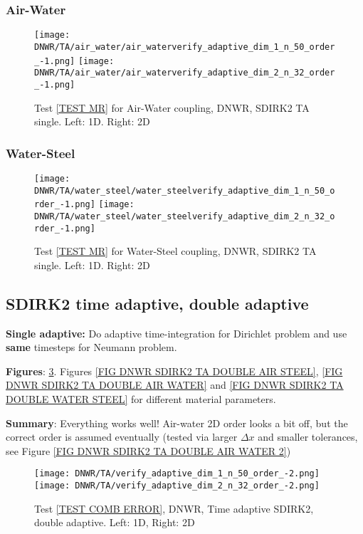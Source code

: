 \documentclass[a4paper,10pt]{article}
\begin{document}
\FloatBarrier
\subsubsection{Air-Water}\label{SEC DNWR TA SINGLE AIR WATER}
% 

\begin{figure}[!ht]
\texttt{[image: DNWR/TA/air\_water/air\_waterverify\_adaptive\_dim\_1\_n\_50\_order\_-1.png]}
\texttt{[image: DNWR/TA/air\_water/air\_waterverify\_adaptive\_dim\_2\_n\_32\_order\_-1.png]}
\caption{Test \ref{TEST MR} for Air-Water coupling, DNWR, SDIRK2 TA single. Left: 1D. Right: 2D}
\label{FIG DNWR SDIRK2 TA SINGLE AIR WATER}
\end{figure}

\FloatBarrier
\subsubsection{Water-Steel}\label{SEC DNWR TA SINGLE WATER STEEL}
% 

\begin{figure}[!ht]
\texttt{[image: DNWR/TA/water\_steel/water\_steelverify\_adaptive\_dim\_1\_n\_50\_order\_-1.png]}
\texttt{[image: DNWR/TA/water\_steel/water\_steelverify\_adaptive\_dim\_2\_n\_32\_order\_-1.png]}
\caption{Test \ref{TEST MR} for Water-Steel coupling, DNWR, SDIRK2 TA single. Left: 1D. Right: 2D}
\label{FIG DNWR SDIRK2 TA SINGLE WATER STEEL}
\end{figure}

\FloatBarrier
\subsection{SDIRK2 time adaptive, double adaptive}\label{SEC DWNR SDIRK2 TA DOUBLE}
% 
\textbf{Single adaptive:} Do adaptive time-integration for Dirichlet problem and use \textbf{same} timesteps for Neumann problem. 

\textbf{Figures}: \ref{FIG DNWR SDIRK2 TA DOUBLE ERROR}. Figures \ref{FIG DNWR SDIRK2 TA DOUBLE AIR STEEL}, \ref{FIG DNWR SDIRK2 TA DOUBLE AIR WATER} and \ref{FIG DNWR SDIRK2 TA DOUBLE WATER STEEL} for different material parameters.

\textbf{Summary}: Everything works well! Air-water 2D order looks a bit off, but the correct order is assumed eventually (tested via larger $\Delta x$ and smaller tolerances, see Figure \ref{FIG DNWR SDIRK2 TA DOUBLE AIR WATER 2})

\begin{figure}[!ht]
\texttt{[image: DNWR/TA/verify\_adaptive\_dim\_1\_n\_50\_order\_-2.png]}
\texttt{[image: DNWR/TA/verify\_adaptive\_dim\_2\_n\_32\_order\_-2.png]}
\caption{Test \ref{TEST COMB ERROR}, DNWR, Time adaptive SDIRK2, double adaptive. Left: 1D, Right: 2D}
\label{FIG DNWR SDIRK2 TA DOUBLE ERROR}
\end{figure}
\end{document}
